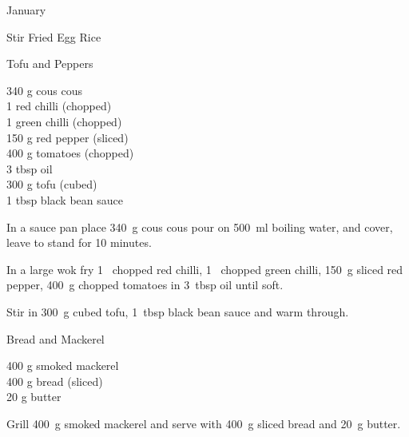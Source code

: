 \begin{menu}{January}
\begin{recipe}{2}{Stir Fried Egg Rice}
\begin{instructions}
    \end{instructions}
    \end{recipe}%
  
    \begin{recipe}{2}{Tofu and Peppers}%
		\begin{ingredients}
		340 g cous cous  \\
	1  red chilli (chopped) \\
	1  green chilli (chopped) \\
	150 g red pepper (sliced) \\
	400 g tomatoes (chopped) \\
	3 tbsp oil  \\
	300 g tofu (cubed) \\
	1 tbsp black bean sauce  \\
	
		\end{ingredients}
	
	
    \begin{instructions}
    \item 
    In a
    sauce pan 
    place
    340~g  cous cous
    pour on
    500~ml  boiling water,
    and cover, leave to stand for 10 minutes.
  \item 
        In a large wok fry
        1~ chopped red chilli,
        1~ chopped green chilli,
        150~g sliced red pepper,
        400~g chopped tomatoes
        in
        3~tbsp  oil
        until soft.
      \item 
        Stir in
        300~g cubed tofu,
        1~tbsp  black bean sauce
        and warm through.
      
    \end{instructions}
    \end{recipe}%
  
    \begin{recipe}{1}{Bread and Mackerel}%
		\begin{ingredients}
		400 g smoked mackerel  \\
	400 g bread (sliced) \\
	20 g butter  \\
	
		\end{ingredients}
	
	
    \begin{instructions}
    \item 
        Grill
        400~g  smoked mackerel
        and serve with
        400~g sliced bread
        and
        20~g  butter.
      
    \end{instructions}
    \end{recipe}%
  
    \clearpage
    \end{menu}
	
